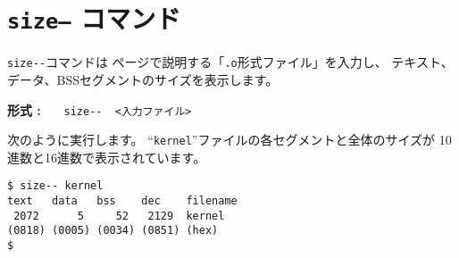\section{{\tt size--} コマンド}

\verb/size--/コマンドは
\pageref{app:oformat}ページで説明する「\verb/.o/形式ファイル」を入力し、
テキスト、データ、BSSセグメントのサイズを表示します。

\begin{flushleft}
{\bf 形式 : }~~~\verb/size--  <入力ファイル>/
\end{flushleft}

次のように実行します。
``\verb/kernel/''ファイルの各セグメントと全体のサイズが
10進数と16進数で表示されています。

\begin{mylist}
\begin{verbatim}
$ size-- kernel
text   data   bss    dec    filename
 2072      5     52   2129  kernel
(0818) (0005) (0034) (0851) (hex)
$
\end{verbatim}
\end{mylist}
